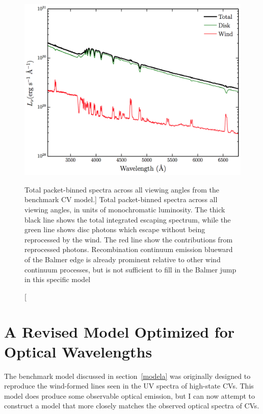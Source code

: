 \begin{figure} 
\centering
\includegraphics[width=1.0\textwidth]{figures/05-cvpaper/modela_escaping.png}
\caption
[Total packet-binned spectra across all viewing angles from the benchmark CV model.]
{Total packet-binned spectra across all viewing angles, in units
of monochromatic luminosity.
The thick black line shows the total 
integrated escaping spectrum, 
while the green line shows disc photons which escape without being reprocessed by
the wind. The red line show the contributions from reprocessed photons. 
Recombination continuum emission blueward of the Balmer 
edge is already prominent relative to other wind continuum processes, but is not sufficient
to fill in the Balmer jump in this specific model}
\label{cont}
\end{figure} 





%
%

\section{A Revised Model Optimized for Optical Wavelengths}
\label{sec:modelb}
The benchmark model discussed in section~\ref{modela} was originally
designed to reproduce the wind-formed lines seen in the UV spectra of
high-state CVs. This model does produce some observable
optical emission, but I can now attempt to construct a model that more closely 
matches the observed optical spectra of CVs. 


